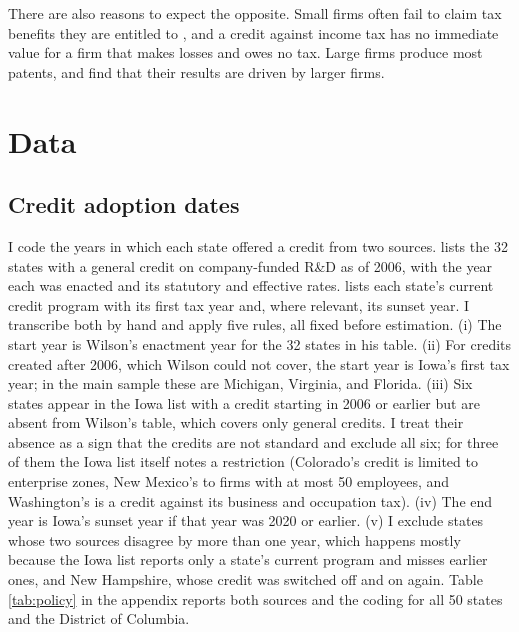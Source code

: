 \documentclass[12pt]{article}
\begin{document}
There are also reasons to expect the opposite. Small firms often fail to claim tax benefits they are entitled
to \citep{zwick2021costs}, and a credit against income tax has no immediate value for a firm that makes losses
and owes no tax. Large firms produce most patents, and \citet{melnik2024rd} find that their results are driven
by larger firms.

\section{Data}\label{sec:data}

\subsection{Credit adoption dates}

I code the years in which each state offered a credit from two sources. \citet{wilson2009beggar} lists the 32
states with a general credit on company-funded R\&D as of 2006, with the year each was enacted and its
statutory and effective rates. \citet{iowa2021research} lists each state's current credit program with its
first tax year and, where relevant, its sunset year. I transcribe both by hand and apply five rules, all fixed
before estimation. (i) The start year is Wilson's enactment year for the 32 states in his table. (ii) For
credits created after 2006, which Wilson could not cover, the start year is Iowa's first tax year; in the main
sample these are Michigan, Virginia, and Florida. (iii) Six states appear in the Iowa list with a credit
starting in 2006 or earlier but are absent from Wilson's table, which covers only general credits. I treat
their absence as a sign that the credits are not standard and exclude all six; for three of them the Iowa list
itself notes a restriction (Colorado's credit is limited to enterprise zones, New Mexico's to firms with at most
50 employees, and Washington's is a credit against its business and occupation tax). (iv) The end year is Iowa's
sunset year if that year was 2020 or earlier. (v) I exclude states whose two sources disagree by more than one
year, which happens mostly because the Iowa list reports only a state's current program and misses earlier
ones, and New Hampshire, whose credit was switched off and on again. Table \ref{tab:policy} in the appendix
reports both sources and the coding for all 50 states and the District of Columbia.
\end{document}
